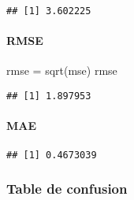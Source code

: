 \documentclass[
]{article}
\newenvironment{Shaded}{\begin{snugshade}}{\end{snugshade}}
\newcommand{\DecValTok}[1]{\textcolor[rgb]{0.00,0.00,0.81}{#1}}
\newcommand{\FunctionTok}[1]{\textcolor[rgb]{0.00,0.00,0.00}{#1}}
\newcommand{\NormalTok}[1]{#1}
\newcommand{\OtherTok}[1]{\textcolor[rgb]{0.56,0.35,0.01}{#1}}
\newcommand{\SpecialCharTok}[1]{\textcolor[rgb]{0.00,0.00,0.00}{#1}}
\begin{document}
\begin{Shaded}
\end{Shaded}

\begin{verbatim}
## [1] 3.602225
\end{verbatim}

\hypertarget{rmse-1}{%
\paragraph{RMSE}\label{rmse-1}}

\begin{Shaded}
\begin{Highlighting}[]
\NormalTok{rmse }\OtherTok{=} \FunctionTok{sqrt}\NormalTok{(mse)}
\NormalTok{rmse}
\end{Highlighting}
\end{Shaded}

\begin{verbatim}
## [1] 1.897953
\end{verbatim}

\hypertarget{mae}{%
\paragraph{MAE}\label{mae}}

\begin{Shaded}
\end{Shaded}

\begin{verbatim}
## [1] 0.4673039
\end{verbatim}

\hypertarget{table-de-confusion-2}{%
\subsubsection{Table de confusion}\label{table-de-confusion-2}}
\end{document}

